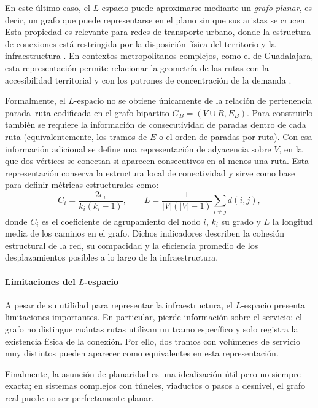                 En este último caso, el $L\text{-espacio}$ puede aproximarse mediante un \textit{grafo planar}, es decir, un grafo que puede representarse en el plano sin que sus aristas se crucen. Esta propiedad es relevante para redes de transporte urbano, donde la estructura de conexiones está restringida por la disposición física del territorio y la infraestructura \cite{rodrigues2020}. En contextos metropolitanos complejos, como el de Guadalajara, esta representación permite relacionar la geometría de las rutas con la accesibilidad territorial y con los patrones de concentración de la demanda \cite{barraza2021}.

                Formalmente, el $L\text{-espacio}$ no se obtiene únicamente de la relación de pertenencia parada--ruta codificada en el grafo bipartito $G_B=(V \cup R,E_B)$. Para construirlo también se requiere la información de consecutividad de paradas dentro de cada ruta (equivalentemente, los tramos de $E$ o el orden de paradas por ruta). Con esa información adicional se define una representación de adyacencia sobre $V$, en la que dos vértices se conectan si aparecen consecutivos en al menos una ruta. Esta representación conserva la estructura local de conectividad y sirve como base para definir métricas estructurales como:
                $$
                C_i = \frac{2e_i}{k_i(k_i - 1)}, \qquad L = \frac{1}{|V|(|V|-1)} \sum_{i\neq j} d(i,j),
                $$
                donde $C_i$ es el coeficiente de agrupamiento del nodo $i$, $k_i$ su grado y $L$ la longitud media de los caminos en el grafo. Dichos indicadores describen la cohesión estructural de la red, su compacidad y la eficiencia promedio de los desplazamientos posibles a lo largo de la infraestructura.

                \paragraph{Limitaciones del $L$-espacio}
                A pesar de su utilidad para representar la infraestructura, el $L$-espacio presenta limitaciones importantes. En particular, pierde información sobre el servicio: el grafo no distingue cuántas rutas utilizan un tramo específico y solo registra la existencia física de la conexión. Por ello, dos tramos con volúmenes de servicio muy distintos pueden aparecer como equivalentes en esta representación.
                
                Finalmente, la asunción de planaridad es una idealización útil pero no siempre exacta; en sistemas complejos con túneles, viaductos o pasos a desnivel, el grafo real puede no ser perfectamente planar.

